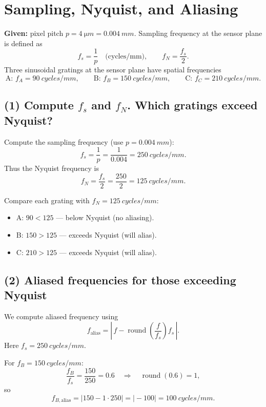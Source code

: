 \documentclass[12pt,a4paper]{article}
\begin{document}


\section{Sampling, Nyquist, and Aliasing}

\textbf{Given:} pixel pitch \(p=\SI{4}{\micro m}=\SI{0.004}{mm}\).  
Sampling frequency at the sensor plane is defined as
\[
f_s=\frac{1}{p}\quad\text{(cycles/mm)},\qquad f_N=\frac{f_s}{2}.
\]
Three sinusoidal gratings at the sensor plane have spatial frequencies
\[
\text{A: } f_A=\SI{90}{cycles/mm},\qquad
\text{B: } f_B=\SI{150}{cycles/mm},\qquad
\text{C: } f_C=\SI{210}{cycles/mm}.
\]

\subsection*{(1) Compute \(f_s\) and \(f_N\). Which gratings exceed Nyquist?}

Compute the sampling frequency (use \(p=\SI{0.004}{mm}\)):
\[
f_s=\frac{1}{p}=\frac{1}{0.004}=\SI{250}{cycles/mm}.
\]
Thus the Nyquist frequency is
\[
f_N=\frac{f_s}{2}=\frac{250}{2}=\SI{125}{cycles/mm}.
\]

Compare each grating with \(f_N=\SI{125}{cycles/mm}\):
\begin{itemize}
  \item A: \(90 < 125\) — below Nyquist (no aliasing).
  \item B: \(150 > 125\) — exceeds Nyquist (will alias).
  \item C: \(210 > 125\) — exceeds Nyquist (will alias).
\end{itemize}

\subsection*{(2) Aliased frequencies for those exceeding Nyquist}

We compute aliased frequency using
\[
f_{\text{alias}}=\left|\,f - \operatorname{round}\!\left(\frac{f}{f_s}\right)f_s\,\right|.
\]
Here \(f_s=\SI{250}{cycles/mm}\).

For \(f_B=\SI{150}{cycles/mm}\):
\[
\frac{f_B}{f_s}=\frac{150}{250}=0.6 \quad\Rightarrow\quad \operatorname{round}(0.6)=1,
\]
so
\[
f_{B,\text{alias}}=\big|150 - 1\cdot250\big|=\big|-100\big|=\SI{100}{cycles/mm}.
\]
\end{document}
